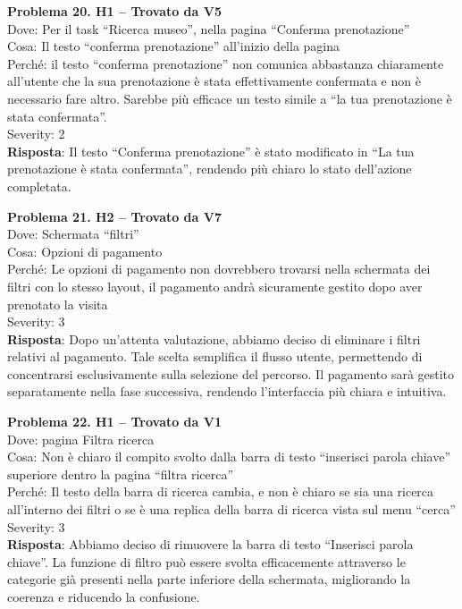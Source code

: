 \documentclass{article}
\begin{document}
\noindent \textbf{Problema 20. H1 – Trovato da V5} \\
Dove: Per il task “Ricerca museo”, nella pagina “Conferma prenotazione” \\
Cosa: Il testo “conferma prenotazione” all’inizio della pagina \\
Perché: il testo “conferma prenotazione” non comunica abbastanza chiaramente all’utente che la sua prenotazione è stata effettivamente confermata e non è necessario fare altro. Sarebbe più efficace un testo simile a “la tua prenotazione è stata confermata”. \\
Severity: 2 \\
\textbf{Risposta}: Il testo “Conferma prenotazione” è stato modificato in “La tua prenotazione è stata confermata”, rendendo più chiaro lo stato dell’azione completata.

\noindent \textbf{Problema 21. H2 – Trovato da V7} \\
Dove: Schermata “filtri” \\
Cosa: Opzioni di pagamento \\
Perché: Le opzioni di pagamento non dovrebbero trovarsi nella schermata dei filtri con lo stesso layout, il pagamento andrà sicuramente gestito dopo aver prenotato la visita \\
Severity: 3 \\
\textbf{Risposta}: Dopo un'attenta valutazione, abbiamo deciso di eliminare i filtri relativi al pagamento. Tale scelta semplifica il flusso utente, permettendo di concentrarsi esclusivamente sulla selezione del percorso. Il pagamento sarà gestito separatamente nella fase successiva, rendendo l’interfaccia più chiara e intuitiva.

\noindent \textbf{Problema 22. H1 – Trovato da V1} \\
Dove: pagina Filtra ricerca \\
Cosa: Non è chiaro il compito svolto dalla barra di testo “inserisci parola chiave” superiore dentro la pagina “filtra ricerca” \\
Perché: Il testo della barra di ricerca cambia, e non è chiaro se sia una ricerca all’interno dei filtri o se è una replica della barra di ricerca vista sul menu “cerca” \\
Severity: 3 \\
\textbf{Risposta}: Abbiamo deciso di rimuovere la barra di testo “Inserisci parola chiave”. La funzione di filtro può essere svolta efficacemente attraverso le categorie già presenti nella parte inferiore della schermata, migliorando la coerenza e riducendo la confusione.
\end{document}
